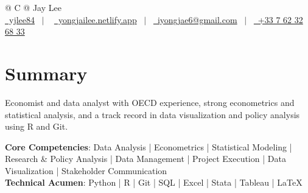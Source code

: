 \documentclass[a4paper,12pt]{article}
\begin{document}
\pagestyle{empty} 



\begin{tabularx}{\linewidth}{@{} C @{}}
\Huge{Jay Lee} \\[7.5pt]
\href{https://github.com/yjlee84}{\raisebox{-0.05\height}\faGithub\ yjlee84} \ $|$ \ 
\href{https://yongjailee.netlify.app}{\raisebox{-0.05\height}\faGlobe \ yongjailee.netlify.app} \ $|$ \ 
\href{mailto:email@mysite.com}{\raisebox{-0.05\height}\faEnvelope \ iyongjae6@gmail.com} \ $|$ \ 
\href{tel:+000000000000}{\raisebox{-0.05\height}\faMobile \ +33 7 62 32 68 33} \\
\end{tabularx}


\section{Summary}
Economist and data analyst with OECD experience, strong econometrics and statistical analysis, and a track record in data visualization and policy analysis using R and Git.

\textbf{Core Competencies}: Data Analysis | Econometrics | Statistical Modeling | Research \& Policy Analysis | Data Management | Project Execution | Data Visualization | Stakeholder Communication\\
\textbf{Technical Acumen}: Python | R | Git | SQL | Excel | Stata | Tableau | \LaTeX{}
\end{document}
